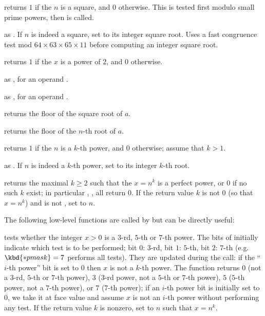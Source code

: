 
 returns $1$ if the  $n$ is
a square, and $0$ otherwise. This is tested first modulo small prime
powers, then  is called.

 as . If
$n$ is indeed a square, set  to its integer square root.
Uses a fast congruence test mod $64\times 63\times 65\times 11$ before
computing an integer square root.

 returns $1$ if the  $x$ is a power of
$2$, and $0$ otherwise.

 as ,
for an  operand .

 as ,
for an  operand .

 returns the floor of the square root of $a$.

 returns the floor of the $n$-th root
of $a$.

 returns $1$ if the  $n$ is a
$k$-th power, and $0$ otherwise; assume that $k > 1$.

 as . If
$n$ is indeed a $k$-th power, set  to its integer $k$-th root.

 returns the maximal $k\geq 2$  such
that the  $x = n^k$ is a perfect power, or $0$ if no such $k$ exist;
in particular , ,  all
return 0. If the return value $k$ is not $0$ (so that $x = n^k$) and
 is not , set  to $n$.

The following low-level functions are called by  but can
be directly useful:

 tests whether the
integer $x > 0$ is a $3$-rd, $5$-th or $7$-th power. The bits of 
initially indicate which test is to be performed;
bit $0$: $3$-rd,
bit $1$: $5$-th,
bit $2$: $7$-th (e.g.~$\kbd{*pmask} = 7$ performs all tests). They are
updated during the call: if the ``$i$-th power'' bit is set to $0$
then $x$ is not a $k$-th power. The function returns $0$
(not a
$3$-rd,
$5$-th or
$7$-th power),
$3$
($3$-rd power,
not a $5$-th or
$7$-th power),
$5$
($5$-th power,
not a $7$-th power),
or $7$
($7$-th power); if an $i$-th power bit is initially set to $0$, we take it
at face value and assume $x$ is not an $i$-th power without performing any
test. If the return value $k$ is nonzero, set  to $n$ such that $x
= n^k$.

